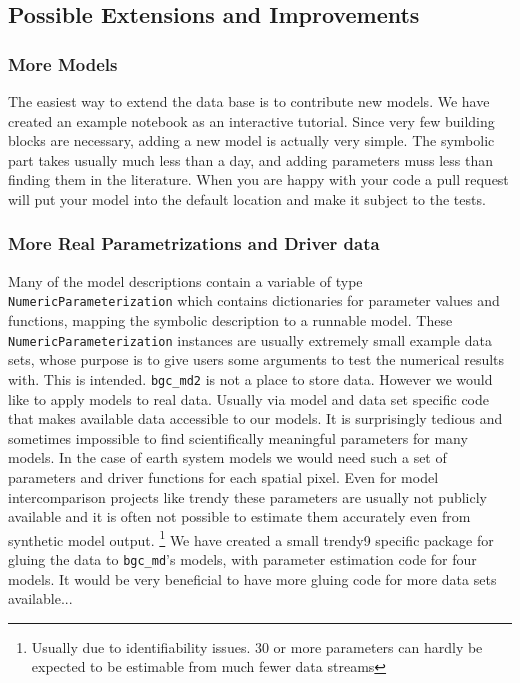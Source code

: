 \subsection{Possible Extensions and Improvements}
\subsubsection{More Models}
The easiest way to extend the data base is to contribute new models.
We have created an example notebook as an interactive tutorial.
Since very few building blocks are necessary, adding a new model is actually very simple.
The symbolic part takes usually much less than a day, 
and adding parameters muss less than finding them in the literature.
When you are happy with your code a pull request will put your model into the default location 
and make it subject to the tests. 
\subsubsection{More Real Parametrizations and Driver data}
Many of the model descriptions contain a variable of type \texttt{NumericParameterization} 
which contains dictionaries for parameter values and functions, mapping the symbolic description to a runnable model.
These \texttt{NumericParameterization} instances are usually extremely small example data sets, whose purpose is to give users some arguments to test the numerical results with.
This is intended. \texttt{bgc\_md2} is not a place to store data.
However we would like to apply models to real data. Usually via model and data set specific code that makes available data accessible to our models.
It is surprisingly tedious  and sometimes impossible to find scientifically meaningful parameters for many models.
In the case of earth system models we would need such a set of parameters and driver functions for each spatial pixel.
Even for model intercomparison projects like trendy  these parameters are usually not publicly available and it is 
often not possible to estimate them accurately even from synthetic model output. 
\footnote{
  Usually due to identifiability issues. 
  30 or more parameters can hardly be expected to be estimable from much fewer data streams
}
We have created a small trendy9 specific package for gluing the data to \texttt{bgc\_md}'s models, with parameter estimation code for four models.
It would be very beneficial to have more gluing code for more data sets available...


